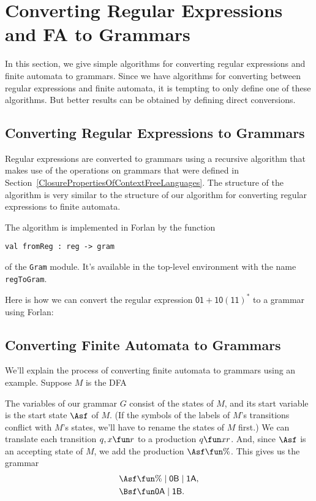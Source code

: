 \section{Converting Regular Expressions and FA to Grammars}
\label{ConvertingRegularExpressionsAndFAToGrammars}

In this section, we give simple algorithms for converting regular
expressions and finite automata to grammars.  Since we have algorithms
for converting between regular expressions and finite automata, it is
tempting to only define one of these algorithms.  But better results
can be obtained by defining direct conversions.

\subsection{Converting Regular Expressions to Grammars}

Regular expressions are converted to grammars using a recursive
algorithm that makes use of the operations on grammars that were
defined in Section~\ref{ClosurePropertiesOfContextFreeLanguages}.  The
structure of the algorithm is very similar to the structure of our
algorithm for converting regular expressions to finite automata.

The algorithm is implemented in Forlan by the function
\begin{verbatim}
val fromReg : reg -> gram
\end{verbatim}
of the \texttt{Gram} module.  It's available in the top-level
environment with the name \texttt{regToGram}.

Here is how we can convert the regular expression $\mathsf{01 +
10(11)^*}$ to a grammar using Forlan:


\subsection{Converting Finite Automata to Grammars}

We'll explain the process of converting finite automata to grammars
using an example.  Suppose $M$ is the DFA
\begin{center}
  
\end{center}
The variables of our grammar $G$ consist of the states of $M$, and its
start variable is the start state $\Asf$ of $M$.
(If the symbols of the labels of $M$'s transitions conflict with $M$'s states,
we'll have to rename the states of $M$ first.)
We can translate each transition $q, x\fun r$ to a production
$q\fun xr$.  And, since $\Asf$ is an accepting state of
$M$, we add the production $\Asf\fun\%$.
This gives us the grammar
\begin{align*}
  \Asf &\fun \% \mid \mathsf{0B} \mid \mathsf{1A} , \\
  \Bsf &\fun \mathsf{0A} \mid \mathsf{1B} .
\end{align*}

